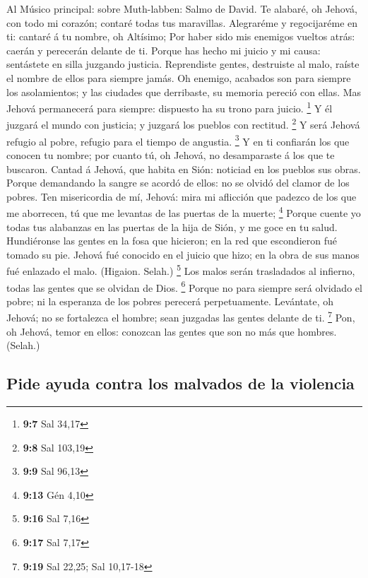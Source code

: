  Al Músico principal: sobre Muth-labben: Salmo de David. Te
alabaré, oh Jehová, con todo mi corazón; contaré todas tus maravillas.
 Alegraréme y regocijaréme en ti: cantaré á tu nombre, oh
Altísimo;  Por haber sido mis enemigos vueltos atrás: caerán
y perecerán delante de ti.  Porque has hecho mi juicio y mi
causa: sentástete en silla juzgando justicia.  Reprendiste
gentes, destruiste al malo, raíste el nombre de ellos para siempre
jamás.  Oh enemigo, acabados son para siempre los
asolamientos; y las ciudades que derribaste, su memoria pereció con
ellas.  Mas Jehová permanecerá para siempre: dispuesto ha su
trono para juicio. \footnote{\textbf{9:7} Sal 34,17}  Y él
juzgará el mundo con justicia; y juzgará los pueblos con rectitud.
\footnote{\textbf{9:8} Sal 103,19}  Y será Jehová refugio al
pobre, refugio para el tiempo de angustia. \footnote{\textbf{9:9} Sal
  96,13}  Y en ti confiarán los que conocen tu nombre; por
cuanto tú, oh Jehová, no desamparaste á los que te buscaron.
 Cantad á Jehová, que habita en Sión: noticiad en los
pueblos sus obras.  Porque demandando la sangre se acordó
de ellos: no se olvidó del clamor de los pobres.  Ten
misericordia de mí, Jehová: mira mi aflicción que padezco de los que me
aborrecen, tú que me levantas de las puertas de la muerte; \footnote{\textbf{9:13}
  Gén 4,10}  Porque cuente yo todas tus alabanzas en las
puertas de la hija de Sión, y me goce en tu salud. 
Hundiéronse las gentes en la fosa que hicieron; en la red que
escondieron fué tomado su pie.  Jehová fué conocido en el
juicio que hizo; en la obra de sus manos fué enlazado el malo. (Higaion.
Selah.) \footnote{\textbf{9:16} Sal 7,16}  Los malos serán
trasladados al infierno, todas las gentes que se olvidan de Dios.
\footnote{\textbf{9:17} Sal 7,17}  Porque no para siempre
será olvidado el pobre; ni la esperanza de los pobres perecerá
perpetuamente.  Levántate, oh Jehová; no se fortalezca el
hombre; sean juzgadas las gentes delante de ti. \footnote{\textbf{9:19}
  Sal 22,25; Sal 10,17-18}  Pon, oh Jehová, temor en ellos:
conozcan las gentes que son no más que hombres. (Selah.)

\hypertarget{pide-ayuda-contra-los-malvados-de-la-violencia}{%
\subsection{Pide ayuda contra los malvados de la
violencia}\label{pide-ayuda-contra-los-malvados-de-la-violencia}}

